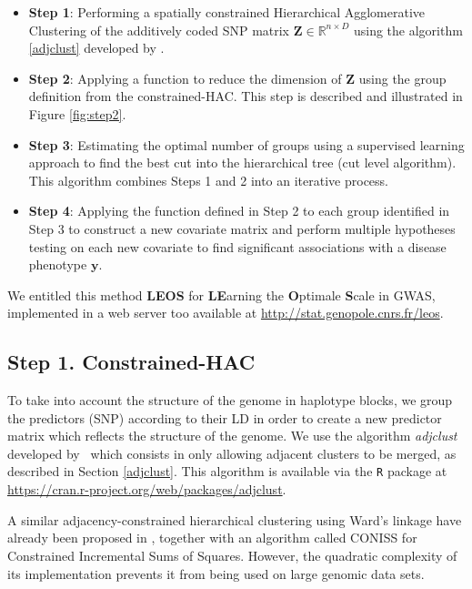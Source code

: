 \documentclass[]{book}
\begin{document}
\begin{itemize}
\item
  \textbf{Step 1}: Performing a spatially constrained Hierarchical Agglomerative
  Clustering of the additively coded SNP matrix
  \(\mathbf{Z} \in \mathbb{R}^{n \times D}\) using the algorithm \ref{adjclust}
  developed by \citep{dehman_performance_2015}.
\item
  \textbf{Step 2}: Applying a function to reduce the dimension of \(\mathbf{Z}\) using the group
  definition from the constrained-HAC. This step is described and
  illustrated in Figure \ref{fig:step2}.
\item
  \textbf{Step 3}: Estimating the optimal number of groups using a supervised learning
  approach to find the best cut into the hierarchical tree (cut level
  algorithm). This algorithm combines Steps 1 and 2 into an iterative
  process.
\item
  \textbf{Step 4}: Applying the function defined in Step 2 to each group identified in
  Step 3 to construct a new covariate matrix and perform multiple
  hypotheses testing on each new covariate to find significant
  associations with a disease phenotype \(\mathbf{y}\).
\end{itemize}

We entitled this method \textbf{LEOS} for \textbf{LE}arning the \textbf{O}ptimale
\textbf{S}cale in GWAS, implemented in a web server too available at
\url{http://stat.genopole.cnrs.fr/leos}.

\hypertarget{CHAC}{%
\subsection{Step 1. Constrained-HAC}\label{CHAC}}

To take into account the structure of the genome in haplotype blocks, we
group the predictors (SNP) according to their LD in order to create a
new predictor matrix which reflects the structure of the genome. We use
the algorithm \emph{adjclust} developed by~\citep{dehman_performance_2015} which
consists in only allowing adjacent clusters to be merged, as described
in Section \ref{adjclust}. This algorithm is available via the \texttt{R}
package at \url{https://cran.r-project.org/web/packages/adjclust}.

A similar adjacency-constrained hierarchical clustering using Ward's
linkage have already been proposed in \citep{grimm1987coniss}, together with
an algorithm called CONISS for Constrained Incremental Sums of Squares.
However, the quadratic complexity of its implementation prevents it from
being used on large genomic data sets.
\end{document}
